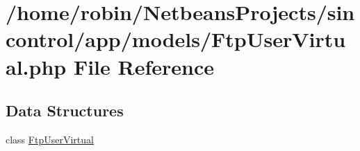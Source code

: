 \hypertarget{_ftp_user_virtual_8php}{}\section{/home/robin/\+Netbeans\+Projects/sincontrol/app/models/\+Ftp\+User\+Virtual.php File Reference}
\label{_ftp_user_virtual_8php}
\subsection*{Data Structures}
\begin{DoxyCompactItemize}
\item 
class \hyperlink{class_ftp_user_virtual}{Ftp\+User\+Virtual}
\end{DoxyCompactItemize}
